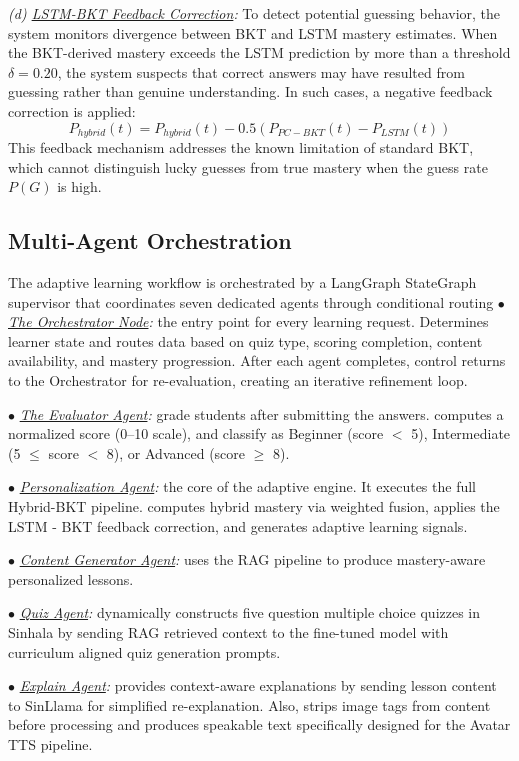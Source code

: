 \documentclass[conference]{IEEEtran}
\begin{document}
\textit{(d) \underline{LSTM-BKT Feedback Correction}:} To detect potential guessing behavior, the system monitors divergence between BKT and LSTM mastery estimates. When the BKT-derived mastery exceeds the LSTM prediction by more than a threshold $\delta = 0.20$, the system suspects that correct answers may have resulted from guessing rather than genuine understanding. In such cases, a negative feedback correction is applied:
{\small
\begin{equation}
P_{hybrid}(t) = P_{hybrid}(t) - 0.5(P_{PC-BKT}(t) - P_{LSTM}(t))
\end{equation}
}
This feedback mechanism addresses the known limitation of standard BKT, which cannot distinguish lucky guesses from true mastery when the guess rate $P(G)$ is high.

\subsection{Multi-Agent Orchestration}
The adaptive learning workflow is orchestrated by a LangGraph StateGraph supervisor that coordinates seven dedicated agents through conditional routing 
$\bullet$ \textit{\underline{The Orchestrator Node}:} the entry point for every learning request. Determines learner state and routes data based on quiz type, scoring completion, content availability, and mastery progression. After each agent completes, control returns to the Orchestrator for re-evaluation, creating an iterative refinement loop.

$\bullet$ \textit{\underline{The Evaluator Agent}:} grade students after submitting the answers. computes a normalized score (0–10 scale), and classify as Beginner (score $<$ 5), Intermediate (5 $\le$ score $<$ 8), or Advanced (score $\ge$ 8).

$\bullet$ \textit{\underline{Personalization Agent}:} the core of the adaptive engine. It executes the full Hybrid-BKT pipeline. computes hybrid mastery via weighted fusion, applies the LSTM - BKT feedback correction, and generates adaptive learning signals.

$\bullet$ \textit{\underline{Content Generator Agent}:} uses the RAG pipeline to produce mastery-aware personalized lessons.

$\bullet$ \textit{\underline{Quiz Agent}:} dynamically constructs five question multiple choice quizzes in Sinhala by sending RAG retrieved context to the fine-tuned model with curriculum aligned quiz generation prompts.

$\bullet$ \textit{\underline{Explain Agent}:} provides context-aware explanations by sending lesson content to SinLlama for simplified re-explanation. Also, strips image tags from content before processing and produces speakable text specifically designed for the Avatar TTS pipeline.
\end{document}
